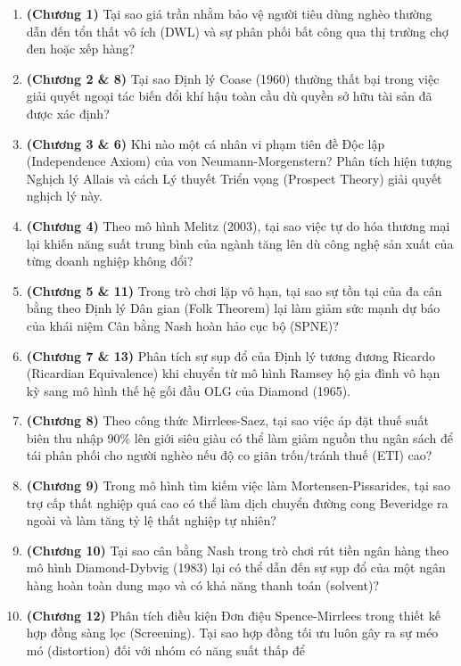 \documentclass[
]{article}
\providecommand{\tightlist}{%
  \setlength{\itemsep}{0pt}\setlength{\parskip}{0pt}}
\begin{document}
\begin{enumerate}
\def\labelenumi{\arabic{enumi}.}
\tightlist
\item
  \textbf{(Chương 1)} Tại sao giá trần nhằm bảo vệ người tiêu dùng nghèo
  thường dẫn đến tổn thất vô ích (DWL) và sự phân phối bất công qua thị
  trường chợ đen hoặc xếp hàng?
\item
  \textbf{(Chương 2 \& 8)} Tại sao Định lý Coase (1960) thường thất bại
  trong việc giải quyết ngoại tác biến đổi khí hậu toàn cầu dù quyền sở
  hữu tài sản đã được xác định?
\item
  \textbf{(Chương 3 \& 6)} Khi nào một cá nhân vi phạm tiên đề Độc lập
  (Independence Axiom) của von Neumann-Morgenstern? Phân tích hiện tượng
  Nghịch lý Allais và cách Lý thuyết Triển vọng (Prospect Theory) giải
  quyết nghịch lý này.
\item
  \textbf{(Chương 4)} Theo mô hình Melitz (2003), tại sao việc tự do hóa
  thương mại lại khiến năng suất trung bình của ngành tăng lên dù công
  nghệ sản xuất của từng doanh nghiệp không đổi?
\item
  \textbf{(Chương 5 \& 11)} Trong trò chơi lặp vô hạn, tại sao sự tồn
  tại của đa cân bằng theo Định lý Dân gian (Folk Theorem) lại làm giảm
  sức mạnh dự báo của khái niệm Cân bằng Nash hoàn hảo cục bộ (SPNE)?
\item
  \textbf{(Chương 7 \& 13)} Phân tích sự sụp đổ của Định lý tương đương
  Ricardo (Ricardian Equivalence) khi chuyển từ mô hình Ramsey hộ gia
  đình vô hạn kỳ sang mô hình thế hệ gối đầu OLG của Diamond (1965).
\item
  \textbf{(Chương 8)} Theo công thức Mirrlees-Saez, tại sao việc áp đặt
  thuế suất biên thu nhập 90\% lên giới siêu giàu có thể làm giảm nguồn
  thu ngân sách để tái phân phối cho người nghèo nếu độ co giãn
  trốn/tránh thuế (ETI) cao?
\item
  \textbf{(Chương 9)} Trong mô hình tìm kiếm việc làm
  Mortensen-Pissarides, tại sao trợ cấp thất nghiệp quá cao có thể làm
  dịch chuyển đường cong Beveridge ra ngoài và làm tăng tỷ lệ thất
  nghiệp tự nhiên?
\item
  \textbf{(Chương 10)} Tại sao cân bằng Nash trong trò chơi rút tiền
  ngân hàng theo mô hình Diamond-Dybvig (1983) lại có thể dẫn đến sự sụp
  đổ của một ngân hàng hoàn toàn dung mạo và có khả năng thanh toán
  (solvent)?
\item
  \textbf{(Chương 12)} Phân tích điều kiện Đơn điệu Spence-Mirrlees
  trong thiết kế hợp đồng sàng lọc (Screening). Tại sao hợp đồng tối ưu
  luôn gây ra sự méo mó (distortion) đối với nhóm có năng suất thấp để

\end{enumerate}
\end{document}
